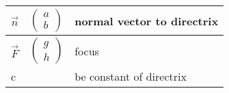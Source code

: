 \begin{table}[H]
    \centering
    \begin{tabular}{|l|l|l|}
    \hline
      $\vec{n}$   & $\begin{pmatrix}a\\b\end{pmatrix}$ & normal vector to directrix\\
      \hline
      $\vec{F}$   & $\begin{pmatrix}g\\h\end{pmatrix}$ & focus\\
      \hline
      c   & & be constant of directrix \\
      \hline
    \end{tabular}
    \label{tab:tables/table3.tex}
\end{table}